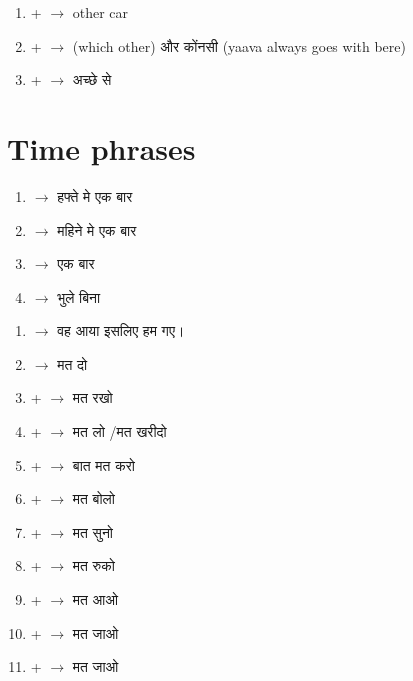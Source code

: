 \documentclass{article}
\begin{document}
\begin{enumerate}
    \item {\s {} +  $\longrightarrow$ \s other car } 
    \item {\s {} +  $\longrightarrow$ \s (which other) और कोंनसी } (yaava always goes with bere) 
    \item {\s {} +  $\longrightarrow$ \s अच्छे से } 
\end{enumerate}

\section{\s Time phrases}


\begin{enumerate}
    \item {\s {} $\longrightarrow$ \s हफ्ते मे एक बार } 
    \item {\s {} $\longrightarrow$ \s महिने मे एक बार } 
    \item {\s {} $\longrightarrow$ \s एक बार } 
    \item {\s {} $\longrightarrow$ \s भुले बिना } 

\end{enumerate}


\begin{enumerate}
    \item {\s {}  $\longrightarrow$ \s वह आया इसलिए हम गए। } 
    \item {\s {}  $\longrightarrow$ मत दो  } 
    \item {\s {} +  $\longrightarrow$ मत रखो  } 
    \item {\s {} +  $\longrightarrow$ मत लो /मत खरीदो }
    \item {\s {} +  $\longrightarrow$ बात  मत करो }
    \item {\s {} +  $\longrightarrow$ मत बोलो }
    \item {\s {} +  $\longrightarrow$ मत सुनो }
    \item {\s {} +  $\longrightarrow$ मत रुको }
    \item {\s {} +  $\longrightarrow$ मत आओ }
    \item {\s {} +  $\longrightarrow$ मत जाओ }
    \item {\s {} +  $\longrightarrow$ मत जाओ }
    
\end{enumerate}
\end{document}
